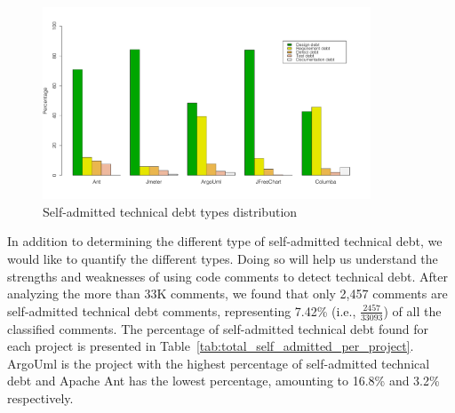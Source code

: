 
\begin{figure}[thb!]
  \centering
  \includegraphics[width=0.87\textwidth]{figures/chapter3/technical_debt_distribution.pdf}
  \vspace{-3mm}
  \caption{Self-admitted technical debt types distribution}
  \label{chap3:fig:satd_distribution}
\end{figure}

In addition to determining the different type of self-admitted technical debt, we would like to quantify the different types. Doing so will help us understand the strengths and weaknesses of using code comments to detect technical debt. After analyzing the more than 33K comments, we found that only 2,457 comments are self-admitted technical debt comments, representing 7.42\% (i.e., $\frac{2457}{33093}$) of all the classified comments. The percentage of self-admitted technical debt found for each project is presented in Table~\ref{tab:total_self_admitted_per_project}. ArgoUml is the project with the highest percentage of self-admitted technical debt and Apache Ant has the lowest percentage, amounting to 16.8\% and 3.2\% respectively.

